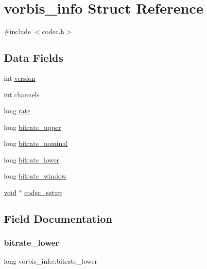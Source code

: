 \hypertarget{structvorbis__info}{}\section{vorbis\+\_\+info Struct Reference}
\label{structvorbis__info}


{\ttfamily \#include $<$codec.\+h$>$}

\subsection*{Data Fields}
\begin{DoxyCompactItemize}
\item 
int \hyperlink{structvorbis__info_a2d832259b1e3fbf4d1cd619ab5743612}{version}
\item 
int \hyperlink{structvorbis__info_a4240e042b91744b4fd810426f18252b4}{channels}
\item 
long \hyperlink{structvorbis__info_a01879ed23ecd9605cf6779ef2663a681}{rate}
\item 
long \hyperlink{structvorbis__info_a2d9d0e0725ae71c855ad39ce07bf7c88}{bitrate\+\_\+upper}
\item 
long \hyperlink{structvorbis__info_a71127d3e35c30fa110d7f321302a91b8}{bitrate\+\_\+nominal}
\item 
long \hyperlink{structvorbis__info_a216284288febd46a5547901cd5e6cd62}{bitrate\+\_\+lower}
\item 
long \hyperlink{structvorbis__info_aa511ecfc9eee8129df8f70e62ed08dc7}{bitrate\+\_\+window}
\item 
\hyperlink{png_8h_ac9c84fa68bbad002983e35ce3663c686}{void} $\ast$ \hyperlink{structvorbis__info_a440988f081a417fd1586a4c3d44bc00c}{codec\+\_\+setup}
\end{DoxyCompactItemize}


\subsection{Field Documentation}
\mbox{\label{structvorbis__info_a216284288febd46a5547901cd5e6cd62}} 
\subsubsection{\texorpdfstring{bitrate\+\_\+lower}{bitrate\_lower}}
{\footnotesize\ttfamily long vorbis\+\_\+info\+::bitrate\+\_\+lower}

